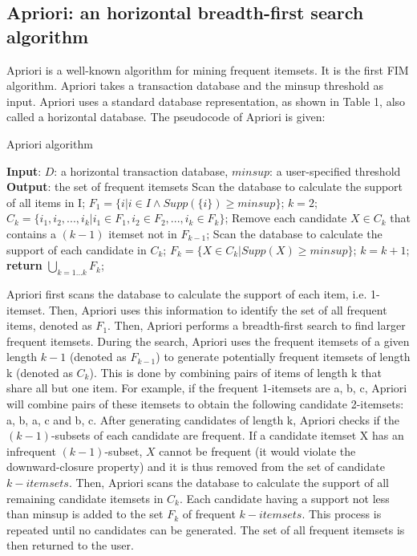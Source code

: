 \subsection{Apriori: an horizontal breadth-first search algorithm}
Apriori\cite{hegland} is a well-known algorithm for mining frequent itemsets.
It is the first FIM algorithm. Apriori takes a transaction database and the minsup
threshold as input. Apriori uses a standard database representation, as shown in Table
1, also called a horizontal database. The pseudocode of Apriori is given:

\begin{algorithm}
    \caption{Apriori algorithm}
    \begin{algorithmic}[1]
        \State \textbf{Input}: $D$: a horizontal transaction database, $minsup$: a user-specified threshold
        \State \textbf{Output}: the set of frequent itemsets
        \State Scan the database to calculate the support of all items in I;
        \State $F_1 = \{i | i \in I \wedge Supp(\{i\}) \ge minsup\}$; 
        \State $k = 2$;
        \State $C_k = \{i_1, i_2, ..., i_k | i_1 \in F_1, i_2 \in F_2, ..., i_k \in F_k\}$; 
        \State Remove each candidate $X \in C_k$ that contains a $(k-1)$ itemset not in $F_{k-1}$;
        \State Scan the database to calculate the support of each candidate in $C_k$;
        \State $F_k = \{X \in C_k | Supp(X) \ge minsup\}$; 
        \State $k = k + 1$;
        \EndWhile
        \State \textbf{return} $\bigcup_{k=1...k} F_k$;
    \end{algorithmic}
\end{algorithm}

Apriori first scans the database to calculate the support of each item, i.e. 1-itemset.
Then, Apriori uses this information to identify the set of all frequent items, denoted as $F_1$.
Then, Apriori performs a breadth-first search to find larger frequent itemsets.
During the search, Apriori uses the frequent itemsets of a given length $k - 1$
(denoted as $F_{k-1}$) to generate potentially frequent itemsets of length k (denoted as $C_k$). This
is done by combining pairs of items of length k that share all but one item.
For example, if the frequent 1-itemsets are {a}, {b}, {c}, Apriori will combine pairs of
these itemsets to obtain the following candidate 2-itemsets: {a, b}, {a, c} and {b, c}.
After generating candidates of length k, Apriori checks if the $(k - 1)$-subsets of
each candidate are frequent. If a candidate itemset X has an infrequent $(k - 1)$-subset, $X$
cannot be frequent (it would violate the downward-closure property) and it is thus removed
from the set of candidate $k-itemsets$.
Then, Apriori scans the database to calculate the
support of all remaining candidate itemsets in $C_k$. Each candidate having a support
not less than minsup is added to the set $F_k$ of frequent $k-itemsets$. This process
is repeated until no candidates can be generated. The set of all frequent itemsets is then
returned to the user.

